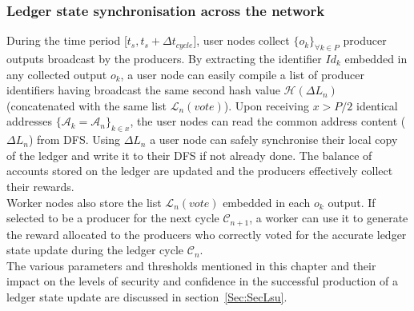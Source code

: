 \documentclass{article}
\begin{document}
\subsubsection{Ledger state synchronisation across the network}

During the time period [$t_{s}, t_s + \Delta t_{cycle}$], user nodes collect $\{o_k\}_{\forall k \in P}$ producer outputs broadcast by the producers. 
By extracting the identifier $Id_k$ embedded in any collected output $o_k$, a user node can easily compile a list of producer identifiers having broadcast the same second hash value $\mathcal{H}(\Delta L_n)$ (concatenated with the same list $\mathcal{L}_{n}(vote)$). Upon receiving $x > P/2$ identical addresses $\{\mathcal{A}_k = \mathcal{A}_n\}_{k \in x}$, the user nodes can read the common address content ($\Delta L_n$) from DFS. Using $\Delta L_n$ a user node can safely synchronise their local copy of the ledger and write it to their DFS if not already done. The balance of accounts stored on the ledger are updated and the producers effectively collect their rewards.\\


Worker nodes also store the list $\mathcal{L}_{n}(vote)$ embedded in each $o_k$ output. If selected to be a producer for the next cycle $\mathcal{C}_{n+1}$, a worker can use it to generate the reward allocated to the producers who correctly voted for the accurate ledger state update during the ledger cycle $\mathcal{C}_{n}$.\\


The various parameters and thresholds mentioned in this chapter and their impact on the levels of security and confidence in the successful production of a ledger state update are discussed in section~\ref{Sec:SecLsu}.





\end{document}
